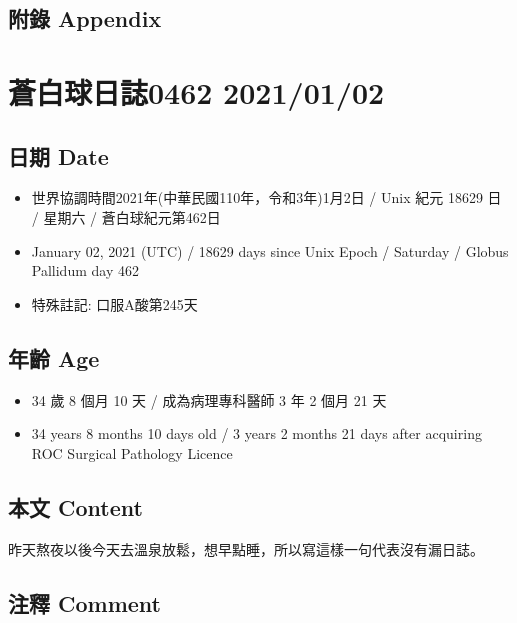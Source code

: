 \documentclass[a5paper, 10pt
]{book}
\providecommand{\tightlist}{%
  \setlength{\itemsep}{0pt}\setlength{\parskip}{0pt}}
\begin{document}
\hypertarget{ux9644ux9304-appendix-31}{%
\subsection{附錄 Appendix}\label{ux9644ux9304-appendix-31}}

\hypertarget{ux84bcux767dux7403ux65e5ux8a8c0462-20210102}{%
\section{蒼白球日誌0462
2021/01/02}\label{ux84bcux767dux7403ux65e5ux8a8c0462-20210102}}

\hypertarget{ux65e5ux671f-date-32}{%
\subsection{日期 Date}\label{ux65e5ux671f-date-32}}

\begin{itemize}
\tightlist
\item
  世界協調時間2021年(中華民國110年，令和3年)1月2日 / Unix 紀元 18629 日
  / 星期六 / 蒼白球紀元第462日
\item
  January 02, 2021 (UTC) / 18629 days since Unix Epoch / Saturday /
  Globus Pallidum day 462
\item
  特殊註記: 口服A酸第245天
\end{itemize}

\hypertarget{ux5e74ux9f61-age-32}{%
\subsection{年齡 Age}\label{ux5e74ux9f61-age-32}}

\begin{itemize}
\tightlist
\item
  34 歲 8 個月 10 天 / 成為病理專科醫師 3 年 2 個月 21 天
\item
  34 years 8 months 10 days old / 3 years 2 months 21 days after
  acquiring ROC Surgical Pathology Licence
\end{itemize}

\hypertarget{ux672cux6587-content-32}{%
\subsection{本文 Content}\label{ux672cux6587-content-32}}

昨天熬夜以後今天去溫泉放鬆，想早點睡，所以寫這樣一句代表沒有漏日誌。

\hypertarget{ux6ce8ux91cb-comment-32}{%
\subsection{注釋 Comment}\label{ux6ce8ux91cb-comment-32}}
\end{document}
